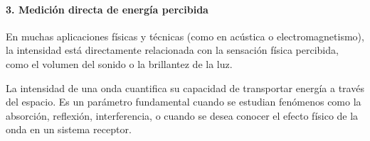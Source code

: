 \paragraph{3. Medición directa de energía percibida}

En muchas aplicaciones físicas y técnicas (como en acústica o electromagnetismo), la intensidad está directamente relacionada con la sensación física percibida, como el volumen del sonido o la brillantez de la luz.

La intensidad de una onda cuantifica su capacidad de transportar energía a través del espacio. Es un parámetro fundamental cuando se estudian fenómenos como la absorción, reflexión, interferencia, o cuando se desea conocer el efecto físico de la onda en un sistema receptor.